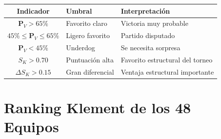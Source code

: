 \documentclass[11pt,a4paper]{article}
\begin{document}
\begin{center}
\begin{tabular}{@{}cll@{}}
\toprule
\textbf{Indicador} & \textbf{Umbral} & \textbf{Interpretación} \\
\midrule
\cellcolor{green!20}$\mathbf{P}_V > 65\%$ & Favorito claro & Victoria muy probable \\
\cellcolor{yellow!30}$45\% \leq \mathbf{P}_V \leq 65\%$ & Ligero favorito & Partido disputado \\
\cellcolor{red!15}$\mathbf{P}_V < 45\%$ & Underdog & Se necesita sorpresa \\
\midrule
$S_K > 0.70$ & Puntuación alta & Favorito estructural del torneo \\
$\Delta S_K > 0.15$ & Gran diferencial & Ventaja estructural importante \\
\bottomrule
\end{tabular}
\end{center}

\newpage

\section{Ranking Klement de los 48 Equipos}
\end{document}
